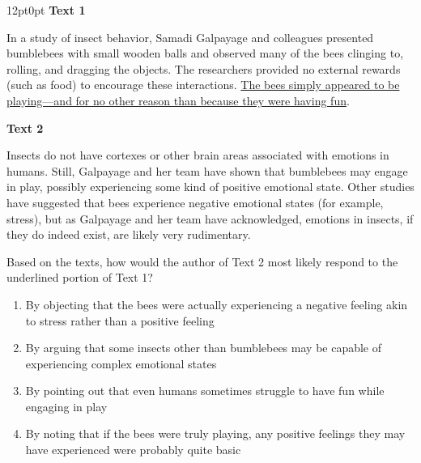 \documentclass[11pt, twocolumn]{article}
\newcounter{questionnum}
\begin{document}
\vspace{6pt}\noindent
\begin{minipage}{\columnwidth}\raggedright
\noindent{}\par\vspace{8pt}
\begin{adjustwidth}{12pt}{0pt}
\textbf{Text 1}

In a study of insect behavior, Samadi Galpayage and colleagues presented bumblebees with small wooden balls and observed many of the bees clinging to, rolling, and dragging the objects. The researchers provided no external rewards (such as food) to encourage these interactions. \uline{The bees simply appeared to be playing---and for no other reason than because they were having fun}.

\vspace{8pt}
\textbf{Text 2}

Insects do not have cortexes or other brain areas associated with emotions in humans. Still, Galpayage and her team have shown that bumblebees may engage in play, possibly experiencing some kind of positive emotional state. Other studies have suggested that bees experience negative emotional states (for example, stress), but as Galpayage and her team have acknowledged, emotions in insects, if they do indeed exist, are likely very rudimentary.
\vspace{6pt}

Based on the texts, how would the author of Text 2 most likely respond to the underlined portion of Text 1?
\begin{enumerate}[label=\Alph*),leftmargin=18pt,topsep=3pt,itemsep=2pt]
  \item By objecting that the bees were actually experiencing a negative feeling akin to stress rather than a positive feeling
  \item By arguing that some insects other than bumblebees may be capable of experiencing complex emotional states
  \item By pointing out that even humans sometimes struggle to have fun while engaging in play
  \item By noting that if the bees were truly playing, any positive feelings they may have experienced were probably quite basic
\end{enumerate}
\end{adjustwidth}
\end{minipage}\par
\end{document}
